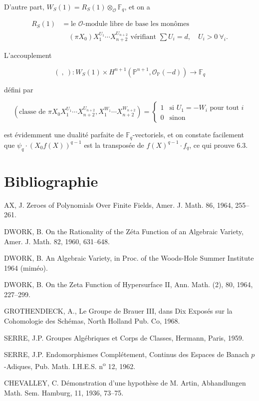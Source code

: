 D'autre part, $W_S(1)=R_S(1)\otimes_{\mathcal O}\mathbb F_q$, et on a

\begin{equation}\tag{6.3.5}
\begin{aligned}
R_S(1)
&=\text{le $\mathcal O$-module libre de base les monômes}\\
&\quad
(\pi X_0)X_1^{U_1}\cdots X_{n+2}^{U_{n+2}}
\text{ vérifiant }
\sum U_i=d,\quad U_i>0\ \forall_i.
\end{aligned}
\end{equation}

L'accouplement

\begin{equation}\tag{6.3.6}
(\ ,\ ):
W_S(1)\times
H^{n+1}(\mathbb P^{n+1},\mathcal O_{\mathbb P}(-d))
\longrightarrow\mathbb F_q
\end{equation}

défini par

\begin{equation}\tag{6.3.7}
\left(
\text{classe de }\pi X_0X_1^{U_1}\cdots X_{n+2}^{U_{n+2}},
X_1^{W_1}\cdots X_{n+2}^{W_{n+2}}
\right)
=
\begin{cases}
1&\text{si }U_1=-W_i\text{ pour tout }i\\
0&\text{sinon}
\end{cases}
\end{equation}

est évidemment une dualité parfaite de $\mathbb F_q$-vectoriels, et on
constate facilement que $\psi_q\cdot(X_0f(X))^{q-1}$ est la transposée de
$f(X)^{q-1}\cdot f_q$, ce qui prouve 6.3.


\section*{Bibliographie}

\begin{enumerate}[label={[\arabic*]},leftmargin=2.4em]
\item AX, J. Zeroes of Polynomials Over Finite Fields,
  Amer. J. Math. 86, 1964, 255--261.
\item DWORK, B. On the Rationality of the Zéta Function of an
  Algebraic Variety, Amer. J. Math. 82, 1960, 631--648.
\item DWORK, B. An Algebraic Variety, in Proc. of the Woods-Hole
  Summer Institute 1964 (miméo).
\item DWORK, B. On the Zeta Function of Hypersurface II,
  Ann. Math. (2), 80, 1964, 227--299.
\item GROTHENDIECK, A., Le Groupe de Brauer III, dans
  Dix Exposés sur la Cohomologie des Schémas,
  North Holland Pub. Co, 1968.
\item SERRE, J.P. Groupes Algébriques et Corps de Classes,
  Hermann, Paris, 1959.
\item SERRE, J.P. Endomorphismes Complétement, Continus des Espaces
  de Banach $p$-Adiques, Pub. Math. I.H.E.S. n\textsuperscript{o} 12, 1962.
\item CHEVALLEY, C. Démonstration d'une hypothèse de M. Artin,
  Abhandlungen Math. Sem. Hamburg, 11, 1936, 73--75.
\end{enumerate}
